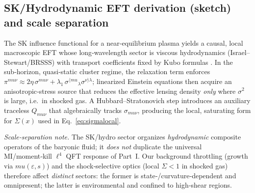 \documentclass[aps,prd,onecolumn,superscriptaddress,nofootinbib]{revtex4-2}
\def\mu{mu}%
\begin{document}
\subsection{SK/Hydrodynamic EFT derivation (sketch) and scale separation}
\label{sec:SK-hydro}
The SK influence functional for a near‑equilibrium plasma yields a causal, local macroscopic EFT whose long‑wavelength sector is viscous hydrodynamics (Israel–Stewart/BRSSS) with transport coefficients fixed by Kubo formulas \cite{IsraelStewart1979,BRSSS2008,Kovtun2012}. In the sub‑horizon, quasi‑static cluster regime, the relaxation term enforces $\pi^{\mu\nu}\approx 2\eta\,\sigma^{\mu\nu}+\lambda_1\,\sigma^{\langle\mu}{}_\lambda \sigma^{\nu\rangle\lambda}$; linearized Einstein equations then acquire an anisotropic‑stress source that reduces the effective lensing density \emph{only} where $\sigma^2$ is large, i.e.\ in shocked gas. A Hubbard–Stratonovich step introduces an auxiliary traceless $Q_{\mu\nu}$ that algebraically tracks $\sigma_{\mu\nu}$, producing the local, saturating form for $\Sigma(x)$ used in Eq.~\eqref{eq:sigmalocal}.

\emph{Scale‑separation note.} The SK/hydro sector organizes \emph{hydrodynamic} composite operators of the baryonic fluid; it \emph{does not} duplicate the universal MI/moment‑kill $\ell^4$ QFT response of Part~I. Our background throttling (growth via $\mu(\varepsilon,s)$) and the shock‑selective optics (local $\Sigma<1$ in shocked gas) therefore affect \emph{distinct} sectors: the former is state‑/curvature‑dependent and omnipresent; the latter is environmental and confined to high‑shear regions.
\end{document}
